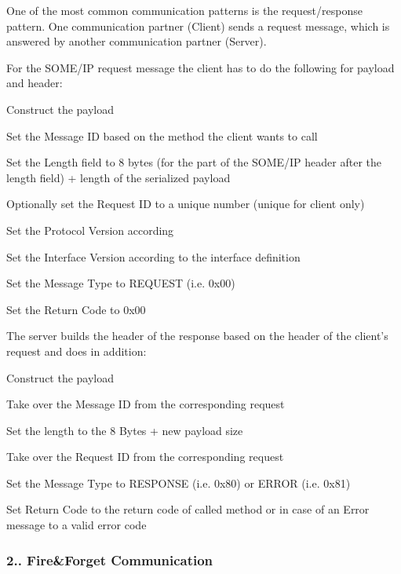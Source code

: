 \begin{DoxyItemize}
\item One of the most common communication patterns is the request/response pattern. One communication partner (Client) sends a request message, which is answered by another communication partner (Server). 
\item For the S\+O\+M\+E/\+IP request message the client has to do the following for payload and header\+:
\begin{DoxyItemize}
\item Construct the payload
\item Set the Message ID based on the method the client wants to call
\item Set the Length field to 8 bytes (for the part of the S\+O\+M\+E/\+IP header after the length field) + length of the serialized payload
\item Optionally set the Request ID to a unique number (unique for client only)
\item Set the Protocol Version according
\item Set the Interface Version according to the interface definition
\item Set the Message Type to R\+E\+Q\+U\+E\+ST (i.\+e. 0x00)
\item Set the Return Code to 0x00
\end{DoxyItemize}
\item The server builds the header of the response based on the header of the client’s request and does in addition\+:
\begin{DoxyItemize}
\item Construct the payload
\item Take over the Message ID from the corresponding request
\item Set the length to the 8 Bytes + new payload size
\item Take over the Request ID from the corresponding request
\item Set the Message Type to R\+E\+S\+P\+O\+N\+SE (i.\+e. 0x80) or E\+R\+R\+OR (i.\+e. 0x81)
\item Set Return Code to the return code of called method or in case of an Error message to a valid error code
\end{DoxyItemize}
\end{DoxyItemize}

\subsubsection*{2.. Fire\&Forget Communication}


